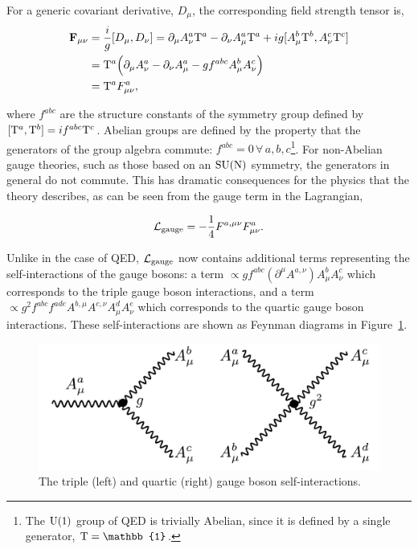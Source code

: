 For a generic covariant derivative, $D_\mu$, the corresponding field strength tensor is,
\begin{equation}
\begin{split}
    \mathbf{F}_{\mu\nu} &= \frac{i}{g}[D_\mu,D_\nu] = \partial_\mu A^a_\nu {\rm{T}}^a - \partial_\nu A^a_\mu {\rm{T}}^a + ig[A^b_\mu {\rm{T}}^b,A^c_\nu {\rm{T}}^c]
    \\
    &= {\rm{T}}^a \Big( \partial_\mu A^a_\nu-\partial_\nu A^a_\mu-gf^{abc}A^b_\mu A^c_\nu \Big) 
    \\
    &= {\rm{T}}^a F^a_{\mu\nu},
\end{split}
\end{equation}

\noindent
where $f^{abc}$ are the structure constants of the symmetry group defined by ${[{\rm{T}}^a,{\rm{T}}^b]=if^{abc}{\rm{T}}^c}$. Abelian groups are defined by the property that the generators of the group algebra commute: $f^{abc}=0\, \forall\, a,b,c$\footnote{The ${\rm{U}}(1)$ group of QED is trivially Abelian, since it is defined by a single generator, ${\rm{T}}=\mathbb{1}$.}. For non-Abelian gauge theories, such as those based on an ${\rm{SU}}({\rm{N}})$ symmetry, the generators in general do not commute. This has dramatic consequences for the physics that the theory describes, as can be seen from the gauge term in the Lagrangian,

\begin{equation}
    \mathcal{L}_{\rm{gauge}} = -\frac{1}{4}F^{a,\mu\nu}F^a_{\mu\nu}.
\end{equation}

\noindent
Unlike in the case of QED, $\mathcal{L}_{\rm{gauge}}$ now contains additional terms representing the self-interactions of the gauge bosons: a term $\propto gf^{abc}(\partial^{\mu} A^{a,\nu})A^b_{\mu}A^c_\nu$ which corresponds to the triple gauge boson interactions, and a term $\propto g^2f^{abc}f^{ade}A^{b,\mu}A^{c,\nu}A^d_{\mu}A^e_\nu$ which corresponds to the quartic gauge boson interactions. These self-interactions are shown as Feynman diagrams in Figure~\ref{fig:gauge_selfinteraction}.

\begin{figure}[htb!]
  \centering
  \includegraphics[width=.6\linewidth]{Figures/theory/gauge_self_interaction.pdf}
  \caption[The gauge boson self-interactions]
  {
    The triple (left) and quartic (right) gauge boson self-interactions.
  }
  \label{fig:gauge_selfinteraction}
\end{figure}

